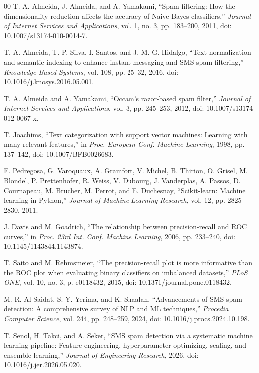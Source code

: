 \documentclass[conference]{IEEEtran}
\begin{document}
\begin{thebibliography}{00}
T. A. Almeida, J. Almeida, and A. Yamakami, ``Spam filtering: How the dimensionality reduction affects the accuracy of Naive Bayes classifiers,'' \emph{Journal of Internet Services and Applications}, vol. 1, no. 3, pp. 183--200, 2011, doi: 10.1007/s13174-010-0014-7.

T. A. Almeida, T. P. Silva, I. Santos, and J. M. G. Hidalgo, ``Text normalization and semantic indexing to enhance instant messaging and SMS spam filtering,'' \emph{Knowledge-Based Systems}, vol. 108, pp. 25--32, 2016, doi: 10.1016/j.knosys.2016.05.001.

T. A. Almeida and A. Yamakami, ``Occam's razor-based spam filter,'' \emph{Journal of Internet Services and Applications}, vol. 3, pp. 245--253, 2012, doi: 10.1007/s13174-012-0067-x.

T. Joachims, ``Text categorization with support vector machines: Learning with many relevant features,'' in \emph{Proc. European Conf. Machine Learning}, 1998, pp. 137--142, doi: 10.1007/BFB0026683.

F. Pedregosa, G. Varoquaux, A. Gramfort, V. Michel, B. Thirion, O. Grisel, M. Blondel, P. Prettenhofer, R. Weiss, V. Dubourg, J. Vanderplas, A. Passos, D. Cournapeau, M. Brucher, M. Perrot, and E. Duchesnay, ``Scikit-learn: Machine learning in Python,'' \emph{Journal of Machine Learning Research}, vol. 12, pp. 2825--2830, 2011.

J. Davis and M. Goadrich, ``The relationship between precision-recall and ROC curves,'' in \emph{Proc. 23rd Int. Conf. Machine Learning}, 2006, pp. 233--240, doi: 10.1145/1143844.1143874.

T. Saito and M. Rehmsmeier, ``The precision-recall plot is more informative than the ROC plot when evaluating binary classifiers on imbalanced datasets,'' \emph{PLoS ONE}, vol. 10, no. 3, p. e0118432, 2015, doi: 10.1371/journal.pone.0118432.

M. R. Al Saidat, S. Y. Yerima, and K. Shaalan, ``Advancements of SMS spam detection: A comprehensive survey of NLP and ML techniques,'' \emph{Procedia Computer Science}, vol. 244, pp. 248--259, 2024, doi: 10.1016/j.procs.2024.10.198.

T. Senol, H. Takci, and A. Seker, ``SMS spam detection via a systematic machine learning pipeline: Feature engineering, hyperparameter optimizing, scaling, and ensemble learning,'' \emph{Journal of Engineering Research}, 2026, doi: 10.1016/j.jer.2026.05.020.




\end{thebibliography}
\end{document}
